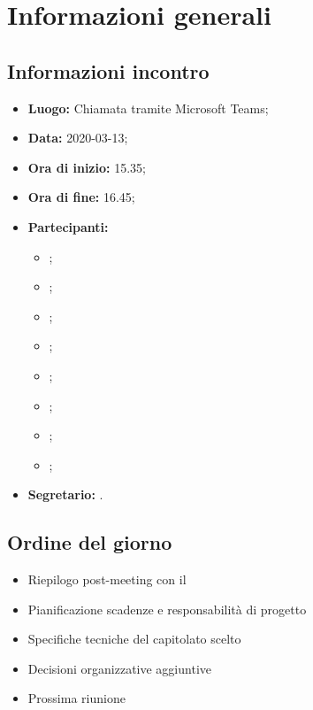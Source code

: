 \section{Informazioni generali}
\subsection{Informazioni incontro}
\begin{itemize}
	\item \textbf{Luogo:} Chiamata tramite Microsoft Teams; 
	\item \textbf{Data:} 2020-03-13; 
	\item \textbf{Ora di inizio:} 15.35; 
	\item \textbf{Ora di fine:} 16.45; 
	\item \textbf{Partecipanti:}
		\begin{itemize}
			\item \VB; 
			\item \LB; 
			\item \NF; 
			\item \EG; 
			\item \FJ; 
			\item \MP; 
			\item \AS; 
			\item \AZ; 
		\end{itemize}
	\item \textbf{Segretario:} \AS. 
\end{itemize}

\subsection{Ordine del giorno}
\begin{itemize}
	\item Riepilogo post-meeting con il \TV{}
	\item Pianificazione scadenze e responsabilità di progetto
	\item Specifiche tecniche del capitolato scelto 
	\item Decisioni organizzative aggiuntive
	\item Prossima riunione
\end{itemize}
